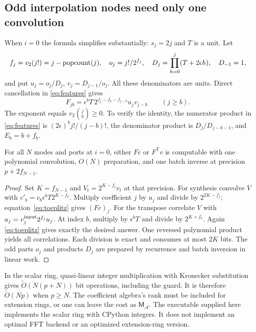 \subsection{Odd interpolation nodes need only one convolution}
When $i=0$ the formula simplifies substantially: $s_j=2j$ and $T$ is a
unit. Let
\[
 f_j=v_2(j!)=j-\operatorname{popcount}(j),\quad o_j=j!/2^{f_j},\quad
 D_j=\prod_{h=0}^j(T+2\epsilon h),\quad D_{-1}=1,
\]
and put $u_j=o_j/D_j$, $v_j=D_{j-1}/o_j$. All these denominators are
units. Direct cancellation in \eqref{eq:features} gives
\begin{equation}\label{eq:toeplitz}
 F_{jb}=\epsilon^bT\,
  2^{f_j-f_b-f_{j-b}}u_jv_{j-b}\qquad(j\ge b).
\end{equation}
The exponent equals $v_2\binom jb\ge0$. To verify the identity, the
numerator product in \eqref{eq:features} is
$(2\epsilon)^b j!/(j-b)!$, the denominator product is
$D_j/D_{j-b-1}$, and $E_b=b+f_b$.

\begin{theorem}\label{thm:oneconv}
For all $N$ modes and ports at $i=0$, either $Fc$ or $F^{\mathsf T}v$
is computable with one polynomial convolution, $O(N)$ preparation,
and one batch inverse at precision $p+2f_{N-1}$.
\end{theorem}
\begin{proof}
Set $K=f_{N-1}$ and $V_t=2^{K-f_t}v_t$ at that precision.
For synthesis convolve $V$ with
$c'_b=c_b\epsilon^bT2^{K-f_b}$. Multiply coefficient $j$ by $u_j$ and
divide by $2^{2K-f_j}$; equation~\eqref{eq:toeplitz} gives $(Fc)_j$.
For the transpose correlate $V$ with $a_j=v^{\rm input}_j2^{f_j}u_j$.
At index $b$, multiply by $\epsilon^bT$ and divide by $2^{K+f_b}$.
Again \eqref{eq:toeplitz} gives exactly the desired answer. One reversed
polynomial product yields all correlations. Each division is exact and
consumes at most $2K$ bits. The odd parts $o_j$ and products $D_j$ are
prepared by recurrence and batch inversion in linear work.
\end{proof}

In the scalar ring, quasi-linear integer multiplication with Kronecker
substitution gives $\widetilde O(N(p+N))$ bit operations, including
the guard. It is therefore $\widetilde O(Np)$ when $p\ge N$. The
coefficient algebra's rank must be included for extension rings, or one
can leave the cost as $\mathsf M_{\mathcal A}$. The executable supplied
here implements the scalar ring with CPython integers. It does not
implement an optimal FFT backend or an optimized extension-ring version.

